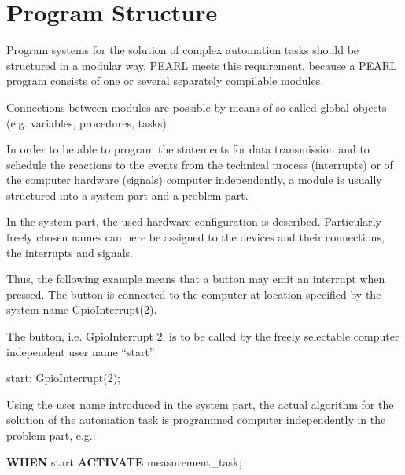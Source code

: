 \section{Program Structure}   %

Program systems for the solution of complex automation tasks should be
structured in a modular way. PEARL meets this requirement, because a
PEARL program consists of one or several separately compilable
modules.

Connections between modules are possible by means of so-called global
objects (e.g. variables, procedures, tasks).

In order to be able to program the statements for data transmission
and to schedule the reactions to the events from the technical process
(interrupts) or of the computer hardware (signals) computer
independently, a module is usually structured into a system part and a
problem part.

In the system part, the used hardware configuration is described.
Particularly freely chosen names can here be assigned to the devices and
their connections, the interrupts and signals. 

%


Thus, the following
example means that a button may emit an interrupt when pressed.
The button is connected to the computer at location specified
by the system name GpioInterrupt(2).

The button, i.e. GpioInterrupt 2, is to be called by the freely selectable
computer independent user name ``start'':

start: GpioInterrupt(2);

Using the user name introduced in the system part, the actual algorithm
for the solution of the automation task is programmed computer
independently in the problem part, e.g.:

{\bf WHEN} start {\bf ACTIVATE} measurement\_task;

